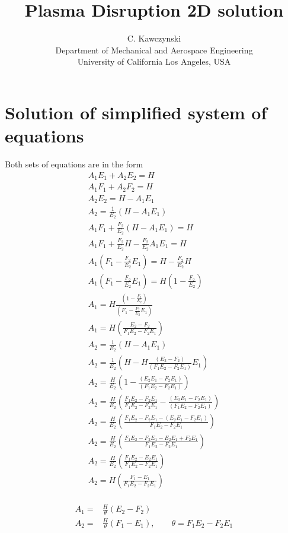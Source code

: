 \documentclass[11pt]{article}
\begin{document}
\doublespacing
\title{Plasma Disruption 2D solution}
\author{C. Kawczynski \\
Department of Mechanical and Aerospace Engineering \\
University of California Los Angeles, USA\\
}

\section{Solution of simplified system of equations}
Both sets of equations are in the form
\begin{equation}\begin{aligned}
A_1 E_1 + A_2 E_2 = H \\
A_1 F_1 + A_2 F_2 = H \\
A_2 E_2 = H - A_1 E_1 \\
A_2 = \frac{1}{E_2} (H - A_1 E_1) \\
A_1 F_1 + \frac{F_2}{E_2} (H - A_1 E_1) = H \\
A_1 F_1 + \frac{F_2}{E_2} H - \frac{F_2}{E_2} A_1 E_1 = H \\
A_1 \left( F_1 - \frac{F_2}{E_2} E_1 \right) = H -\frac{F_2}{E_2} H \\
A_1 \left( F_1 - \frac{F_2}{E_2} E_1 \right) = H \left( 1 - \frac{F_2}{E_2} \right) \\
A_1 = H \frac{\left( 1 - \frac{F_2}{E_2} \right)}{\left( F_1 - \frac{F_2}{E_2} E_1 \right)} \\
\boxed{A_1 = H \left( \frac{E_2 - F_2}{F_1 E_2 - F_2 E_1} \right) } \\
A_2 = \frac{1}{E_2} \left(H - A_1 E_1 \right) \\
A_2 = \frac{1}{E_2} \left(H - H \frac{( E_2 - F_2 )}{( F_1 E_2 - F_2 E_1)} E_1 \right) \\
A_2 = \frac{H}{E_2} \left(1 - \frac{(E_2 E_1 - F_2 E_1)}{(F_1 E_2 - F_2 E_1)} \right) \\
A_2 = \frac{H}{E_2} \left(\frac{F_1 E_2 - F_2 E_1}{F_1 E_2 - F_2 E_1} - \frac{(E_2 E_1 - F_2 E_1)}{(F_1 E_2 - F_2 E_1)} \right) \\
A_2 = \frac{H}{E_2} \left(\frac{F_1 E_2 - F_2 E_1 - (E_2 E_1 - F_2 E_1)}{F_1 E_2 - F_2 E_1}\right) \\
A_2 = \frac{H}{E_2} \left(\frac{F_1 E_2 - F_2 E_1 - E_2 E_1 + F_2 E_1}{F_1 E_2 - F_2 E_1}\right) \\
A_2 = \frac{H}{E_2} \left(\frac{F_1 E_2 - E_2 E_1}{F_1 E_2 - F_2 E_1}\right) \\
\boxed{A_2 = H \left(\frac{F_1 - E_1}{F_1 E_2 - F_2 E_1}\right)} \\
\end{aligned} \end{equation}

\begin{equation}\begin{aligned}
A_1 =& \frac{H}{\theta} (E_2 - F_2) \\
A_2 =& \frac{H}{\theta} (F_1 - E_1), \qquad \theta = F_1 E_2 - F_2 E_1 \\
\end{aligned} \end{equation}
\end{document}
